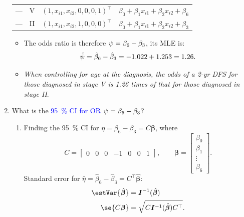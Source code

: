 \documentclass[oneside]{book}\usepackage[]{graphicx}\usepackage[svgnames]{xcolor}
\let\exp\relax%
\providecommand{\Vector}[1]{\bm{#1}}%
\providecommand{\Matrix}[1]{\bm{#1}}
\begin{document}
\begin{enumerate}[label={Q\arabic*:}]
\begin{table}[!htbp]
\begin{tabular}{cccl}
                  \midrule
                  --- & V     & $ (1,x_{i1},x_{i2},0,0,0,1)^\top $ & $ \beta_0+\beta_1x_{i1}+\beta_2x_{i2}+\beta_6 $ \\
                  --- & II    & $ (1,x_{i1},x_{i2},1,0,0,0)^\top $ & $ \beta_0+\beta_1x_{i1}+\beta_2x_{i2}+\beta_3 $ \\
                  \bottomrule
              \end{tabular}
          \end{table}
          \begin{itemize}
              \item The odds ratio is therefore $ \psi=\exp{\beta_6-\beta_3} $, its MLE is:
                    \[ \hat{\psi}=\exp{\hat{\beta}_6-\hat{\beta}_3}=\exp{-1.022+1.253}=1.26. \]
              \item \emph{When controlling for age at the diagnosis, the odds of a 2-yr DFS for those
                        diagnosed in stage V is 1.26 times of that for those diagnosed in stage II}.
          \end{itemize}
    \item What is the \textcolor{Blue}{\qty{95}{\percent} CI for OR $ \psi=\exp{\beta_6-\beta_3} $}?
          \begin{enumerate}[1.]
              \item Finding the \qty{95}{\percent} CI for $ \eta=\beta_6-\beta_3=C \Vector{\beta} $, where
                    \[ C=\begin{bmatrix}
                            0 & 0 & 0 & -1 & 0 & 0 & 1
                        \end{bmatrix},\qquad \Vector{\beta}=\begin{bmatrix}
                            \beta_0 \\
                            \beta_1 \\
                            \vdots  \\
                            \beta_6
                        \end{bmatrix}. \]
                    Standard error for $ \hat{\eta}=\hat{\beta}_6-\hat{\beta}_3=C^\top\hat{\Vector{\beta}} $:
                    \begin{align*}
                        \estVar{\hat{\Vector{\beta}}} & =\Matrix{I}^{-1}(\hat{\Vector{\beta}})                \\
                        \se{C\Vector{\beta}}          & =\sqrt{C\Matrix{I}^{-1}(\hat{\Vector{\beta}})C^\top}.
                    \end{align*}

\end{enumerate}
\end{enumerate}
\end{document}
